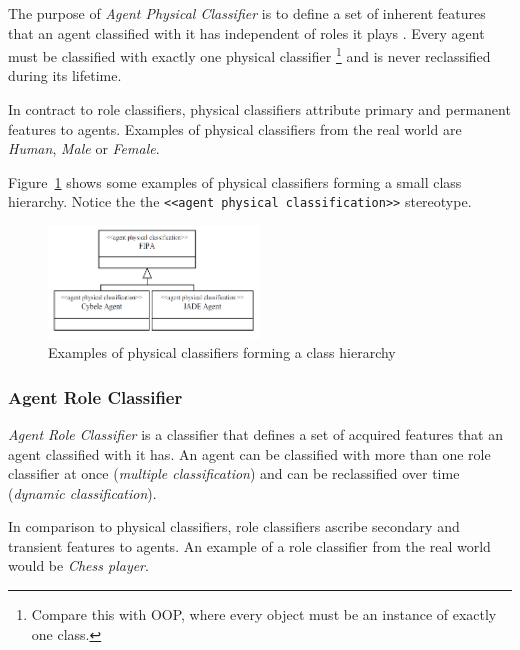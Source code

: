 The purpose of \textit{Agent Physical Classifier} is to define a set of inherent features that an agent classified with it has independent of roles it plays \cite{Odell05}.
Every agent must be classified with exactly one physical classifier
\footnote{Compare this with OOP, where every object must be an instance of exactly one class.} and is never reclassified during its lifetime.

In contract to role classifiers, physical classifiers attribute primary and permanent features to agents.
Examples of physical classifiers from the real world are \textit{Human}, \textit{Male} or \textit{Female}.

Figure~\ref{figure:onp-physical-classifier-examples} shows some examples of physical classifiers forming a small class hierarchy.
Notice the the \texttt{<<agent physical classification>>} stereotype.

\begin{figure}[ht]
	\centering
	\includegraphics[width=0.5\textwidth]{images/onp/physical-classifier-examples.png}
	\caption{Examples of physical classifiers forming a class hierarchy}
	\label{figure:onp-physical-classifier-examples}
\end{figure}

\subsubsection*{Agent Role Classifier}

\textit{Agent Role Classifier} is a classifier that defines a set of acquired features that an agent classified with it has.
An agent can be classified with more than one role classifier at once (\textit{multiple classification}) and can be reclassified over time (\textit{dynamic classification}).

In comparison to physical classifiers, role classifiers ascribe secondary and transient features to agents.
An example of a role classifier from the real world would be \textit{Chess player}.

